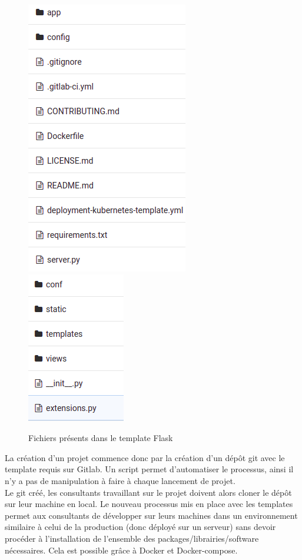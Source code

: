 \documentclass{article} %
\begin{document}
\begin{figure}[!h]
 \centering
 \includegraphics[keepaspectratio = true,scale=0.6]{confflask.png}
 \hspace{2cm}
 \includegraphics[keepaspectratio = true,scale=0.6]{cfla.png}
 \caption{Fichiers présents dans le template Flask}
 \label{fig:cfl}
\end{figure}

La création d'un projet commence donc par la création d'un dépôt git avec le template requis sur Gitlab. Un script permet d'automatiser le processus, ainsi il n'y a pas de manipulation à faire à chaque lancement de projet.\\

Le git créé, les consultants travaillant sur le projet doivent alors cloner le dépôt sur leur machine en local. Le nouveau processus mis en place avec les templates permet aux consultants de développer sur leurs machines dans un environnement similaire à celui de la production (donc déployé sur un serveur) sans devoir procéder à l'installation de l'ensemble des packages/librairies/software nécessaires. Cela est possible grâce à Docker et Docker-compose.\\
\end{document}
